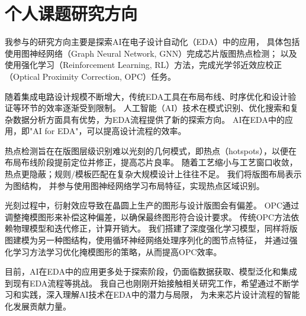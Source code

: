 \section{个人课题研究方向}
我参与的研究方向主要是探索AI在电子设计自动化（EDA）中的应用，
具体包括使用图神经网络（Graph Neural Network, GNN）完成芯片版图热点检测；
以及使用强化学习（Reinforcement Learning, RL）方法，完成光学邻近效应校正（Optical Proximity Correction, OPC）任务。

随着集成电路设计规模不断增大，传统EDA工具在布局布线、时序优化和设计验证等环节的效率逐渐受到限制。
人工智能（AI）技术在模式识别、优化搜索和复杂数据分析方面具有优势，为EDA流程提供了新的探索方向。
AI在EDA中的应用，即"AI for EDA"，可以提高设计流程的效率。


热点检测旨在在版图层级识别难以光刻的几何模式，即热点（hotspots），以便在布局布线阶段提前定位并修正，提高芯片良率。
随着工艺缩小与工艺窗口收敛，热点更隐蔽；规则/模板匹配在复杂大规模设计上往往不足。
我们将版图布局表示为图结构，
并参与使用图神经网络学习布局特征，实现热点区域识别。


光刻过程中，衍射效应导致在晶圆上生产的图形与设计版图会有偏差。
OPC通过调整掩模图形来补偿这种偏差，以确保最终图形符合设计要求。
传统OPC方法依赖物理模型和迭代修正，计算开销大。
我们搭建了深度强化学习模型，同样将版图建模为另一种图结构，使用循环神经网络处理序列化的图节点特征，
并通过强化学习方法学习优化掩模图形的策略，从而提高OPC效率。


目前，AI在EDA中的应用更多处于探索阶段，仍面临数据获取、模型泛化和集成到现有EDA流程等挑战。
我自己也刚刚开始接触相关研究工作，希望通过不断学习和实践，深入理解AI技术在EDA中的潜力与局限，
为未来芯片设计流程的智能化发展贡献力量。